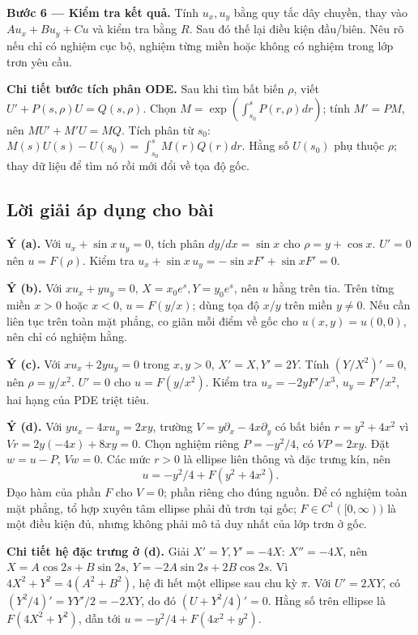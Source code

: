 \documentclass[10pt,a4paper]{article}
\begin{document}
\textbf{Bước 6 — Kiểm tra kết quả.} Tính $u_x,u_y$ bằng quy tắc dây chuyền, thay vào $Au_x+Bu_y+Cu$ và kiểm tra bằng $R$. Sau đó thế lại điều kiện đầu/biên. Nêu rõ nếu chỉ có nghiệm cục bộ, nghiệm từng miền hoặc không có nghiệm trong lớp trơn yêu cầu.

\textbf{Chi tiết bước tích phân ODE.} Sau khi tìm bất biến $\rho$, viết $U'+P(s,\rho)U=Q(s,\rho)$. Chọn $M=\exp(\int_{s_0}^{s}P(r,\rho)dr)$; tính $M'=PM$, nên $MU'+M'U=MQ$. Tích phân từ $s_0$: $M(s)U(s)-U(s_0)=\int_{s_0}^sM(r)Q(r)dr$. Hằng số $U(s_0)$ phụ thuộc $\rho$; thay dữ liệu để tìm nó rồi mới đổi về tọa độ gốc.
\subsection*{Lời giải áp dụng cho bài}
\textbf{Ý (a).} Với $u_x+\sin x\,u_y=0$, tích phân $dy/dx=\sin x$ cho $\rho=y+\cos x$. $U'=0$ nên $u=F(\rho)$. Kiểm tra $u_x+\sin x\,u_y=-\sin xF'+\sin xF'=0$.

\textbf{Ý (b).} Với $xu_x+yu_y=0$, $X=x_0e^s,Y=y_0e^s$, nên $u$ hằng trên tia. Trên từng miền $x>0$ hoặc $x<0$, $u=F(y/x)$; dùng tọa độ $x/y$ trên miền $y\ne0$. Nếu cần liên tục trên toàn mặt phẳng, co giãn mỗi điểm về gốc cho $u(x,y)=u(0,0)$, nên chỉ có nghiệm hằng.

\textbf{Ý (c).} Với $xu_x+2yu_y=0$ trong $x,y>0$, $X'=X,Y'=2Y$. Tính $(Y/X^2)'=0$, nên $\rho=y/x^2$. $U'=0$ cho $u=F(y/x^2)$. Kiểm tra $u_x=-2yF'/x^3$, $u_y=F'/x^2$, hai hạng của PDE triệt tiêu.

\textbf{Ý (d).} Với $yu_x-4xu_y=2xy$, trường $V=y\partial_x-4x\partial_y$ có bất biến $r=y^2+4x^2$ vì $Vr=2y(-4x)+8xy=0$. Chọn nghiệm riêng $P=-y^2/4$, có $VP=2xy$. Đặt $w=u-P$, $Vw=0$. Các mức $r>0$ là ellipse liên thông và đặc trưng kín, nên
\[u=-y^2/4+F(y^2+4x^2).\]
Đạo hàm của phần $F$ cho $V=0$; phần riêng cho đúng nguồn. Để có nghiệm toàn mặt phẳng, tổ hợp xuyên tâm ellipse phải đủ trơn tại gốc; $F\in C^1([0,\infty))$ là một điều kiện đủ, nhưng không phải mô tả duy nhất của lớp trơn ở gốc.

\textbf{Chi tiết hệ đặc trưng ở (d).} Giải $X'=Y,Y'=-4X$: $X''=-4X$, nên $X=A\cos2s+B\sin2s$, $Y=-2A\sin2s+2B\cos2s$. Vì $4X^2+Y^2=4(A^2+B^2)$, hệ đi hết một ellipse sau chu kỳ $\pi$. Với $U'=2XY$, có $(Y^2/4)'=YY'/2=-2XY$, do đó $(U+Y^2/4)'=0$. Hằng số trên ellipse là $F(4X^2+Y^2)$, dẫn tới $u=-y^2/4+F(4x^2+y^2)$.
\end{document}

